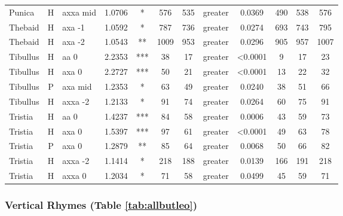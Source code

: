 \documentclass[twocolumn, switch]{article} %
\begin{document}
\begin{table}[h!]
\begin{adjustbox}{totalheight=0.9\textheight}
\begin{tabular}{lclcccclcc@{\hspace{1\tabcolsep}}c@{\hspace{1\tabcolsep}}c}
        Punica &     H &  axxa mid & 1.0706 &     * &   576 &       535 &     greater & 0.0369 &   490 &   538 &   576 \\
       Thebaid &     H &    axa -1 & 1.0592 &     * &   787 &       736 &     greater & 0.0274 &   693 &   743 &   795 \\
       Thebaid &     H &    axa -2 & 1.0543 &    ** &  1009 &       953 &     greater & 0.0296 &   905 &   957 &  1007 \\
      Tibullus &     H &      aa 0 & 2.2353 &   *** &    38 &        17 &     greater & <0.0001 &     9 &    17 &    23 \\
      Tibullus &     H &     axa 0 & 2.2727 &   *** &    50 &        21 &     greater & <0.0001 &    13 &    22 &    32 \\
      Tibullus &     P &   axa mid & 1.2353 &     * &    63 &        49 &     greater & 0.0240 &    38 &    51 &    66 \\
      Tibullus &     H &   axxa -2 & 1.2133 &     * &    91 &        74 &     greater & 0.0264 &    60 &    75 &    91 \\
       Tristia &     H &      aa 0 & 1.4237 &   *** &    84 &        58 &     greater & 0.0006 &    43 &    59 &    73 \\
       Tristia &     H &     axa 0 & 1.5397 &   *** &    97 &        61 &     greater & <0.0001 &    49 &    63 &    78 \\
       Tristia &     P &     axa 0 & 1.2879 &    ** &    85 &        64 &     greater & 0.0068 &    50 &    66 &    82 \\
       Tristia &     H &   axxa -2 & 1.1414 &     * &   218 &       188 &     greater & 0.0139 &   166 &   191 &   218 \\
       Tristia &     H &    axxa 0 & 1.2034 &     * &    71 &        58 &     greater & 0.0499 &    45 &    59 &    71 \\
  \bottomrule
  \end{tabular}
\end{adjustbox}
\end{table}

\subsubsection{Vertical Rhymes (Table \ref{tab:allbutleo})} 
\end{document}
